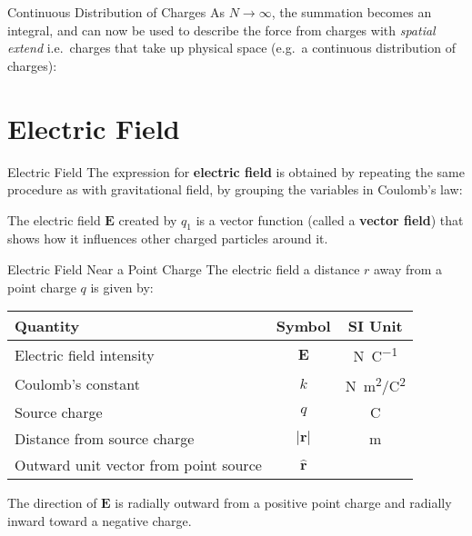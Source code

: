 \documentclass[12pt,aspectratio=169]{beamer}
\begin{document}
\begin{frame}{Continuous Distribution of Charges}
  As $N\rightarrow\infty$, the summation becomes an integral, and can now be
  used to describe the force from charges with \emph{spatial extend} i.e.\
  charges that take up physical space (e.g.\ a continuous distribution of
  charges):

\end{frame}



\section{Electric Field}

\begin{frame}{Electric Field}
  The expression for \textbf{electric field} is obtained by repeating the same
  procedure as with gravitational field, by grouping the variables in
  Coulomb's law:


  \vspace{-.15in}The electric field $\bm{E}$ created by $q_1$ is a vector
  function (called a \textbf{vector field}) that shows how it influences other
  charged particles around it.
\end{frame}



\begin{frame}{Electric Field Near a Point Charge}
  The electric field a distance $r$ away from a point charge $q$ is given by:

  \begin{center}
    \begin{tabular}{l|c|c}
      \rowcolor{pink}
      \textbf{Quantity} & \textbf{Symbol} & \textbf{SI Unit} \\ \hline
      Electric field intensity    & $\bm{E}$ & \si{\newton\per\coulomb}\\
      Coulomb's constant          & $k$   & \si{N.m^2/C^2} \\
      Source charge               & $q$   & \si{\coulomb} \\
      Distance from source charge & $|\bm{r}|$   & \si{\metre} \\
      Outward unit vector from point source & $\hat{\bm{r}}$ &
    \end{tabular}
  \end{center}
  The direction of $\bm{E}$ is radially outward from a positive point charge
  and radially inward toward a negative charge.
\end{frame}
\end{document}
